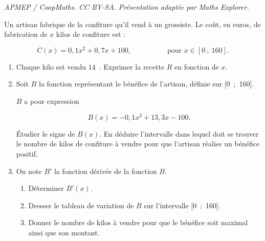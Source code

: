 \documentclass[10pt]{article}
\providecommand{\euro}{\texteuro}
\providecommand{\euro}{{\text{€}}}
\renewcommand{\euro}{\ifmmode\text{\texteuro}\else\texteuro\fi}
\begin{document}
\noindent\textit{APMEP / CoopMaths. CC BY-SA. Présentation adaptée par Maths Explorer.}\par\medskip
\medskip

Un artisan fabrique de la confiture qu'il vend à un grossiste. Le coût, en euros, de fabrication
de $x$ kilos de confiture est :

\[C(x) = 0,1x^2 + 0,7x + 100, \hspace{5em}\text{pour } x \in [0~;~160].\]

\smallskip

\begin{enumerate}
\item Chaque kilo est vendu $14$~\euro. Exprimer la recette $R$ en fonction de $x$.
\item Soit $B$ la fonction représentant le bénéfice de l'artisan, définie sur [0~;~160].

$B$ a pour expression

\[B(x) =- 0,1x^2 + 13,3x - 100.\]

Étudier le signe de $B(x)$. En déduire l'intervalle dans lequel doit se trouver le nombre de
kilos de confiture à vendre pour que l'artisan réalise un bénéfice positif.
\item On note $B'$ la fonction dérivée de la fonction $B$.
	\begin{enumerate}
		\item Déterminer $B'(x)$.
		\item Dresser le tableau de variation de $B$ sur l'intervalle [0~;~160].
		\item Donner le nombre de kilos à vendre pour que le bénéfice soit maximal ainsi que son
montant.
	\end{enumerate}
\end{enumerate}

\vspace{0,5cm}
\end{document}
